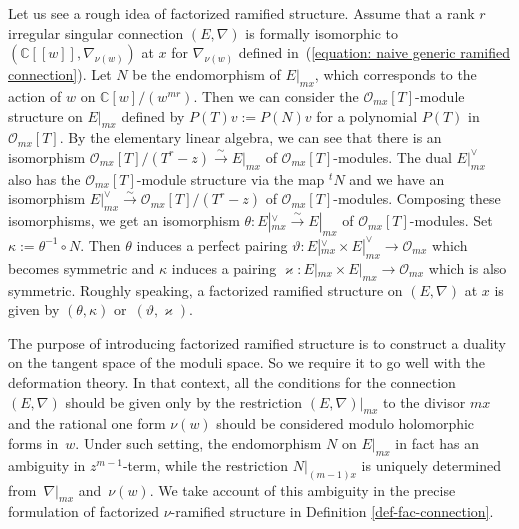 \documentclass[pdftex]{sigma}
\numberwithin{equation}{section}
\begin{document}
Let us see a rough idea of factorized ramified structure.
Assume that a rank $r$ irregular singular connection $(E,\nabla)$ is formally isomorphic to
$(\mathbb{C}[[w]],\nabla_{\nu(w)})$ at $x$ for
$\nabla_{\nu(w)}$ defined in~(\ref{equation: naive generic ramified connection}).
Let $N$ be the endomorphism of $E|_{mx}$,
which corresponds to the action of $w$ on $\mathbb{C}[w]/(w^{mr})$.
Then we can consider the ${\mathcal O}_{mx}[T]$-module structure on
$E|_{mx}$ defined by $P(T)v:=P(N)v$ for a polynomial
$P(T)$ in ${\mathcal O}_{mx}[T]$.
By the elementary linear algebra, we can see that there is an isomorphism
${\mathcal O}_{mx}[T]/(T^r-z)\xrightarrow{\sim} E|_{mx}$
of ${\mathcal O}_{mx}[T]$-modules.
The dual $E|_{mx}^{\vee}$ also has the ${\mathcal O}_{mx}[T]$-module structure
via the map $^tN$ and we have an isomorphism
$E|_{mx}^{\vee} \xrightarrow{\sim} {\mathcal O}_{mx}[T]/(T^r-z)$
of ${\mathcal O}_{mx}[T]$-modules.
Composing these isomorphisms, we get an isomorphism
$\theta\colon E|_{mx}^{\vee} \stackrel{\sim}\longrightarrow E|_{mx}$
of ${\mathcal O}_{mx}[T]$-modules.
Set $\kappa:=\theta^{-1}\circ N$.
Then $\theta$ induces a perfect pairing
$\vartheta\colon E|_{mx}^{\vee}\times E|_{mx}^{\vee}\longrightarrow{\mathcal O}_{mx}$
which becomes symmetric
and $\kappa$ induces a pairing
$\varkappa\colon E|_{mx}\times E|_{mx} \longrightarrow {\mathcal O}_{mx}$
which is also symmetric.
Roughly speaking, a factorized ramified structure on $(E,\nabla)$ at $x$ is
given by $(\theta,\kappa)$ or~$(\vartheta,\varkappa)$.

The purpose of introducing factorized ramified structure
is to construct a duality on the tangent space of the moduli space.
So we require it to go well with the deformation theory.
In that context, all the conditions for the connection $(E,\nabla)$
should be given only by the restriction $(E,\nabla)|_{mx}$ to the divisor $mx$
and the rational one form $\nu(w)$ should be considered modulo holomorphic forms in~$w$.
Under such setting, the endomorphism $N$ on $E|_{mx}$ in fact has an ambiguity
in $z^{m-1}$-term, while the restriction $N|_{(m-1)x}$ is uniquely determined
from~$\nabla|_{mx}$ and~$\nu(w)$.
We take account of this ambiguity in the precise formulation of
factorized $\nu$-ramified structure in
Definition \ref{def-fac-connection}.
\end{document}
